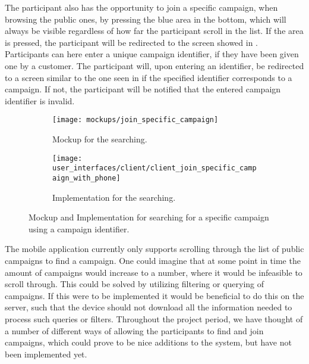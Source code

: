 The participant also has the opportunity to join a specific campaign, when browsing the public ones, by pressing the blue area in the bottom, which will always be visible regardless of how far the participant scroll in the list. If the area is pressed, the participant will be redirected to the screen showed in . Participants can here enter a unique campaign identifier, if they have been given one by a customer. The participant will, upon entering an identifier, be redirected to a screen similar to the one seen in  if the specified identifier corresponds to a campaign. If not, the participant will be notified that the entered campaign identifier is invalid. 

\begin{figure}[!htbp]
    \begin{subfigure}[!t]{.48\textwidth}
        \centering
        \texttt{[image: mockups/join\_specific\_campaign]}
        \caption{Mockup for the searching.}
        \label{fig:mockup_specific_campaign}
    \end{subfigure}%
    \begin{subfigure}[!t]{.52\textwidth}
        \centering
        \texttt{[image: user\_interfaces/client/client\_join\_specific\_campaign\_with\_phone]}
        \caption{Implementation for the searching.}
        \label{fig:implementation_specific_campaign}
    \end{subfigure}
    \caption{Mockup and Implementation for searching for a specific campaign using a campaign identifier.}
    \label{fig:specific_campaign}
\end{figure}
\FloatBarrier

The mobile application currently only supports scrolling through the list of public campaigns to find a campaign. One could imagine that at some point in time the amount of campaigns would increase to a number, where it would be infeasible to scroll through. This could be solved by utilizing filtering or querying of campaigns. If this were to be implemented it would be beneficial to do this on the server, such that the device should not download all the information needed to process such queries or filters. Throughout the project period, we have thought of a number of different ways of allowing the participants to find and join campaigns, which could prove to be nice additions to the system, but have not been implemented yet.

